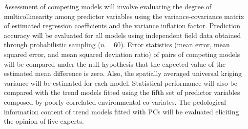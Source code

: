 Assessment of competing models will involve evaluating the degree of multicollinearity among predictor variables using the variance-covariance matrix of estimated regression coefficients and the variance inflation factor. Prediction accuracy will be evaluated for all models using independent field data obtained through probabilistic sampling ($n=60$). Error statistics (mean error, mean squared error, and mean squared deviation ratio) of pairs of competing models will be compared under the null hypothesis that the expected value of the estimated mean difference is zero. Also, the spatially averaged universal kriging variance will be estimated for each model. Statistical performance will also be compared with the trend models fitted using the fifth set of predictor variables composed by poorly correlated environmental co-variates. The pedological information content of trend models fitted with PCs will be evaluated eliciting the opinion of five experts.
